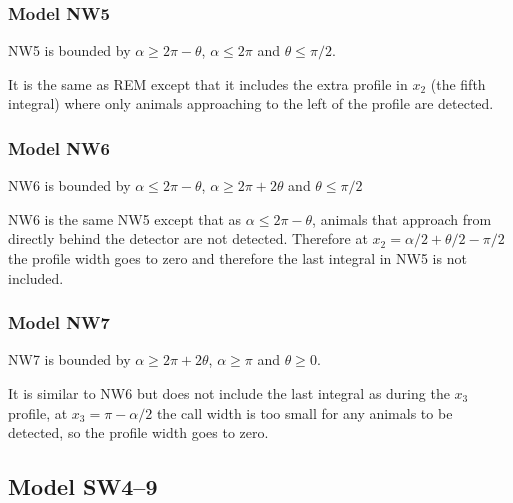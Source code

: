 \subsubsection{Model NW5} \label{NW5}

NW5 is bounded by $\alpha \ge 2\pi - \theta$, $\alpha \le 2\pi$ and $\theta \le \pi/2$.

It is the same as REM except that it includes the extra profile in $x_2$ (the fifth integral) where only animals approaching to the left of the profile are detected.



\subsubsection{Model NW6} \label{NW6}

NW6 is bounded by $\alpha \le 2\pi - \theta$, $\alpha \ge 2\pi + 2\theta$ and $\theta \le \pi/2$

NW6 is the same NW5 except that as $\alpha \le 2\pi - \theta$, animals that approach from directly behind the detector are not detected. Therefore at $x_2 = \alpha/2 + \theta/2 - \pi/2$ the profile width goes to zero and therefore the last integral in NW5 is not included.





\subsubsection{Model NW7} \label{NW7}

NW7 is bounded by $\alpha \ge 2\pi + 2\theta$, $\alpha \ge \pi$ and $\theta \ge 0$.

It is similar to NW6 but does not include the last integral as during the $x_3$ profile, at $x_3 = \pi - \alpha/2$ the call width is too small for any animals to be detected, so the profile width goes to zero.







\subsection{Model SW4--9} \label{SW4--9}

